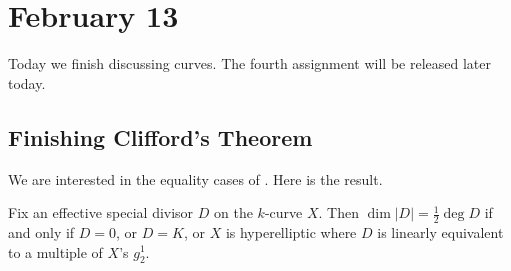 \documentclass[../notes.tex]{subfiles}
\begin{document}
\section{February 13}

Today we finish discussing curves. The fourth assignment will be released later today.

\subsection{Finishing Clifford's Theorem}
We are interested in the equality cases of . Here is the result.
\begin{theorem}[Clifford]
	Fix an effective special divisor $D$ on the $k$-curve $X$. Then $\dim|D|=\frac12\deg D$ if and only if $D=0$, or $D=K$, or $X$ is hyperelliptic where $D$ is linearly equivalent to a multiple of $X$'s $g^1_2$.
\end{theorem}
\end{document}
